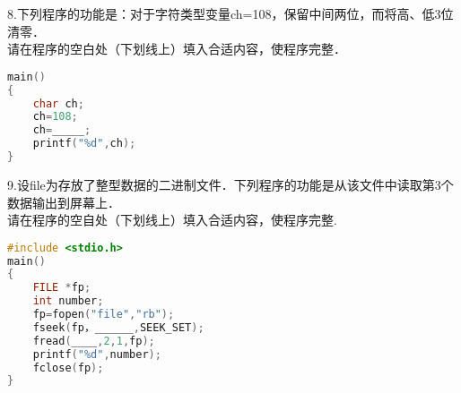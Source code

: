 8.下列程序的功能是：对于字符类型变量ch=108，保留中间两位，而将高、低3位清零． \\
请在程序的空白处（下划线上）填入合适内容，使程序完整．
\begin{lstlisting}[language=cpp]
main()
{
    char ch;
    ch=108;
    ch=_____;
    printf("%d",ch);
}
\end{lstlisting}

9.设file为存放了整型数据的二进制文件．下列程序的功能是从该文件中读取第3个数据输出到屏幕上． \\
请在程序的空自处（下划线上）填入合适内容，使程序完整.
\begin{lstlisting}[language=cpp]
#include <stdio.h>
main()
{
    FILE *fp;
    int number;
    fp=fopen("file","rb");
    fseek(fp，______,SEEK_SET);
    fread(____,2,1,fp);
    printf("%d",number);
    fclose(fp);
}
\end{lstlisting}

